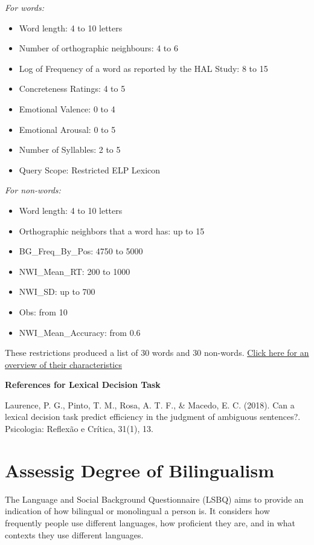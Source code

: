 \documentclass[
]{book}
\providecommand{\tightlist}{%
  \setlength{\itemsep}{0pt}\setlength{\parskip}{0pt}}
\begin{document}
\emph{For words:}

\begin{itemize}
\tightlist
\item
  Word length: 4 to 10 letters
\item
  Number of orthographic neighbours: 4 to 6
\item
  Log of Frequency of a word as reported by the HAL Study: 8 to 15
\item
  Concreteness Ratings: 4 to 5
\item
  Emotional Valence: 0 to 4
\item
  Emotional Arousal: 0 to 5
\item
  Number of Syllables: 2 to 5
\item
  Query Scope: Restricted ELP Lexicon
\end{itemize}

\emph{For non-words:}

\begin{itemize}
\tightlist
\item
  Word length: 4 to 10 letters
\item
  Orthographic neighbors that a word has: up to 15
\item
  BG\_Freq\_By\_Pos: 4750 to 5000
\item
  NWI\_Mean\_RT: 200 to 1000
\item
  NWI\_SD: up to 700
\item
  Obs: from 10
\item
  NWI\_Mean\_Accuracy: from 0.6
\end{itemize}

These restrictions produced a list of 30 words and 30 non-words. \href{link\%20here\%20to\%20excel\%20file}{Click here for an overview of their characteristics}

\textbf{References for Lexical Decision Task}

Laurence, P. G., Pinto, T. M., Rosa, A. T. F., \& Macedo, E. C. (2018). Can a lexical decision task predict efficiency in the judgment of ambiguous sentences?. Psicologia: Reflexão e Crítica, 31(1), 13.

\hypertarget{assessig-degree-of-bilingualism}{%
\section{Assessig Degree of Bilingualism}\label{assessig-degree-of-bilingualism}}

The Language and Social Background Questionnaire (LSBQ) aims to provide an indication of how bilingual or monolingual a person is. It considers how frequently people use different languages, how proficient they are, and in what contexts they use different languages.
\end{document}
